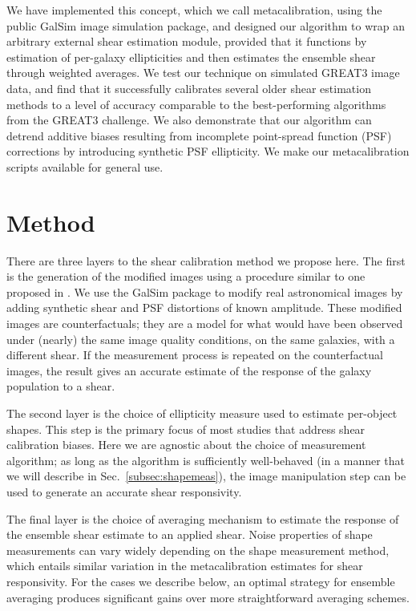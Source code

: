 \documentclass[iop]{emulateapj}
\begin{document}
We have implemented this concept, which we call metacalibration, using
the public GalSim \citep{2015A&C....10..121R} image simulation
package, and designed our algorithm to wrap an arbitrary external
shear estimation module, provided that it functions by estimation of per-galaxy ellipticities and
then estimates the ensemble shear through weighted averages. We test our technique on simulated GREAT3
image data, and find that it successfully calibrates several older shear
estimation methods to a level of accuracy comparable to the
best-performing algorithms from the GREAT3 challenge. We also
demonstrate that our algorithm can detrend additive biases resulting
from incomplete point-spread function (PSF) corrections by introducing synthetic PSF
ellipticity.  We make our metacalibration scripts available for
general use.

\section{Method}
There are three layers to the shear calibration method we propose
here. The first is the generation of the modified images using a procedure similar to one proposed
in \cite{2000ApJ...537..555K}.
We use the GalSim package \citep{2015A&C....10..121R} to modify real
astronomical images by adding synthetic shear and PSF distortions of
known amplitude. These modified images are counterfactuals; they are a
model for what would have been observed under (nearly) the same image
quality conditions, on the same galaxies, with a different shear. If
the measurement process is repeated on the counterfactual images, the
result gives an accurate estimate of the response of the galaxy population to a shear.

The second layer is the choice of ellipticity measure used to estimate
per-object shapes. This step is the primary focus of most studies that
address shear calibration biases. Here we are agnostic about the
choice of measurement algorithm; as long as the algorithm is
sufficiently well-behaved (in a manner that we will describe in
Sec.~\ref{subsec:shapemeas}), the image manipulation step can be used
to generate an accurate shear responsivity.

The final layer is the choice of averaging mechanism to estimate the
response of the ensemble shear estimate to an applied shear. Noise
properties of shape measurements can vary widely depending on the
shape measurement method, which entails similar variation in the
metacalibration estimates for shear responsivity. For the cases we
describe below, an optimal strategy for ensemble averaging produces
significant gains over more straightforward averaging schemes.
\end{document}
